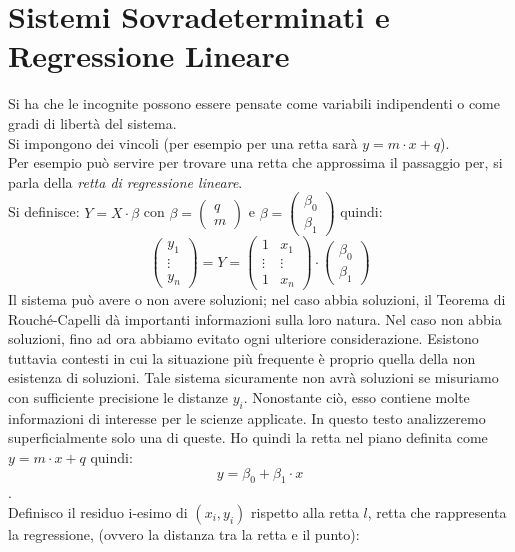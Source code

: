 \documentclass[a4paper,12pt, oneside]{book}
\begin{document}
\chapter{Sistemi Sovradeterminati e Regressione Lineare}
Si ha che le incognite possono essere pensate come variabili indipendenti o come gradi di libertà del sistema.\\
Si impongono dei vincoli (per esempio per una retta sarà $y=m\cdot x+q$).\\
Per esempio può servire per trovare una retta che approssima il passaggio per, si parla della \textit{retta di regressione lineare}. \\
Si definisce: $Y=X\cdot \beta$ con $\beta=
\left(\begin{matrix}
q\\
m
\end{matrix}\right)
$ e $\beta=
\left(\begin{matrix}
\beta_0\\
\beta_1
\end{matrix}\right)
$
quindi:
$$
\left(\begin{matrix}
y_1\\
\vdots\\
y_n
\end{matrix}\right)=Y=\left(\begin{matrix}
1 & x_1\\
\vdots & \vdots\\
1 & x_n
\end{matrix}\right)\cdot\left(\begin{matrix}
\beta_0\\
\beta_1
\end{matrix}\right)
$$
Il sistema può avere o non avere soluzioni;  nel caso abbia soluzioni, il Teorema di Rouché-Capelli dà importanti informazioni sulla loro natura.  Nel caso non abbia soluzioni, fino ad ora
abbiamo evitato ogni ulteriore considerazione.  Esistono tuttavia contesti in cui la situazione
più frequente è proprio quella della non esistenza di soluzioni.
Tale sistema
sicuramente
non
avrà soluzioni se misuriamo con sufficiente precisione le distanze $y_i$.  Nonostante ciò, esso contiene molte informazioni di interesse per le scienze applicate.  In questo
testo analizzeremo superficialmente solo una di queste. 
\newpage
Ho quindi la retta nel piano definita come $y=m\cdot x+q$ quindi: $$y=\beta_0+\beta_1\cdot x$$.\\ 
Definisco il residuo i-esimo di $(x_i, y_i)$ rispetto alla retta $l$, retta che rappresenta la regressione, (ovvero la distanza tra la retta e il punto):
\end{document}
